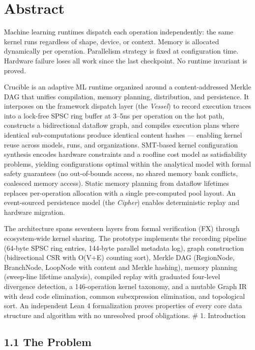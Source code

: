 \section{Abstract}\label{abstract}

Machine learning runtimes dispatch each operation independently: the same kernel runs regardless of shape, device, or context. Memory is allocated dynamically per operation. Parallelism strategy is fixed at configuration time. Hardware failure loses all work since the last checkpoint. No runtime invariant is proved.

Crucible is an adaptive ML runtime organized around a content-addressed Merkle DAG that unifies compilation, memory planning, distribution, and persistence. It interposes on the framework dispatch layer (the \emph{Vessel}) to record execution traces into a lock-free SPSC ring buffer at 3--5ns per operation on the hot path, constructs a bidirectional dataflow graph, and compiles execution plans where identical sub-computations produce identical content hashes --- enabling kernel reuse across models, runs, and organizations. SMT-based kernel configuration synthesis encodes hardware constraints and a roofline cost model as satisfiability problems, yielding configurations optimal within the analytical model with formal safety guarantees (no out-of-bounds access, no shared memory bank conflicts, coalesced memory access). Static memory planning from dataflow lifetimes replaces per-operation allocation with a single pre-computed pool layout. An event-sourced persistence model (the \emph{Cipher}) enables deterministic replay and hardware migration.

The architecture spans seventeen layers from formal verification (FX) through ecosystem-wide kernel sharing. The prototype implements the recording pipeline (64-byte SPSC ring entries, 144-byte parallel metadata log), graph construction (bidirectional CSR with O(V+E) counting sort), Merkle DAG (RegionNode, BranchNode, LoopNode with content and Merkle hashing), memory planning (sweep-line lifetime analysis), compiled replay with graduated four-level divergence detection, a 146-operation kernel taxonomy, and a mutable Graph IR with dead code elimination, common subexpression elimination, and topological sort. An independent Lean 4 formalization proves properties of every core data structure and algorithm with no unresolved proof obligations.
\# 1. Introduction

\subsection{1.1 The Problem}\label{the-problem}

